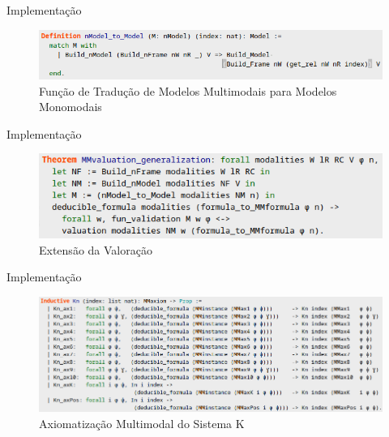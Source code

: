 \documentclass[xcolor=table]{beamer}
\begin{document}
    \begin{frame}{Implementação}
        \begin{adjustwidth}{-.5cm}{}
            \begin{figure}[htbp]
                \centering
                \includegraphics[scale=.475]{ModeloMM->Modelo}
                \caption{Função de Tradução de Modelos Multimodais para Modelos Monomodais}
            \end{figure}
        \end{adjustwidth}
    \end{frame}

    \begin{frame}{Implementação}
        \begin{adjustwidth}{-.5cm}{}
            \begin{figure}[htbp]
                \centering
                \includegraphics[scale=.6]{ProvaGeneralizacaoValoracao.png}
                \caption{Extensão da Valoração}
            \end{figure}
        \end{adjustwidth}
    \end{frame}

    \begin{frame}{Implementação}
        \begin{adjustwidth}{-1cm}{}
            \begin{figure}[htbp]
                \centering
                \includegraphics[scale=.425]{SistemaKMM.png}
                \caption{Axiomatização Multimodal do Sistema K}
            \end{figure}
        \end{adjustwidth}
    \end{frame}
\end{document}
